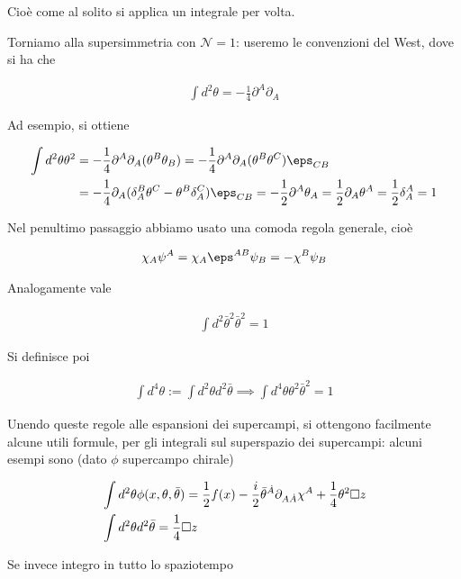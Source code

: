 \documentclass{report}
\begin{document}
Cioè come al solito si applica un integrale per volta. 

Torniamo alla supersimmetria con \(\mathcal{N} = 1\): useremo le convenzioni del West, dove si ha che 

\begin{align}
    \int d^2 \theta = -\frac{1}{4}\partial^A \partial_A
\end{align}

Ad esempio, si ottiene 

\begin{align}
    \int d^2\theta \theta^2 &= -\frac{1}{4}\partial^A \partial_A (\theta^B \theta_B) = -\frac{1}{4}\partial^A \partial_A (\theta^B \theta^C)\eps_{CB} \notag \\
    &= -\frac{1}{4}\partial_A (\delta_A^B \theta^C - \theta^B \delta^C_A)\eps_{CB} = -\frac{1}{2}\partial^A \theta_A = \frac{1}{2}\partial_A \theta^A = \frac{1}{2}\delta^A_A = 1 
\end{align}

Nel penultimo passaggio abbiamo usato una comoda regola generale, cioè 

\begin{align}
    \chi_A \psi^A = \chi_A \eps^{AB}\psi_B = -\chi^B \psi_B
\end{align}

Analogamente vale 

\begin{align}
    \int d^2\bar{\theta}^2 \bar{\theta}^2 = 1
\end{align}

Si definisce poi 

\begin{align}
    \int d^4\theta := \int d^2\theta d^2\bar{\theta} \implies \int d^4\theta \theta^2 \bar{\theta}^2 = 1 
\end{align}

Unendo queste regole alle espansioni dei supercampi, si ottengono facilmente alcune utili formule, per gli integrali sul superspazio dei supercampi: alcuni esempi sono (dato \(\phi\) supercampo chirale)

\begin{align}
    &\int d^2\theta \phi(x, \theta, \bar{\theta}) = \frac{1}{2}f(x) - \frac{i}{2}\bar{\theta}^{\dot{A}}\partial_{A\dot{A}}\chi^A + \frac{1}{4}\theta^2 \square z \notag \\ 
    &\int d^2\theta d^2\bar{\theta} = \frac{1}{4}\square z
\end{align}

Se invece integro in tutto lo spaziotempo
\end{document}
